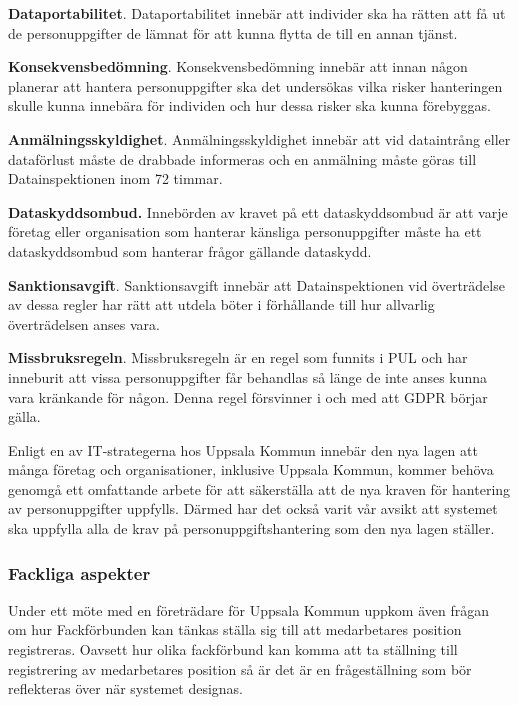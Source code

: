 \documentclass[a4paper,12pt]{article}
\begin{document}
 \textbf{Dataportabilitet}. Dataportabilitet innebär att individer ska ha rätten att få ut de personuppgifter de lämnat för att kunna flytta de till en annan tjänst.

 \textbf{Konsekvensbedömning}. Konsekvensbedömning innebär att innan någon planerar att hantera personuppgifter ska det undersökas vilka risker hanteringen skulle kunna innebära för individen och hur dessa risker ska kunna förebyggas.

 \textbf{Anmälningsskyldighet}. Anmälningsskyldighet innebär att vid dataintrång eller dataförlust måste de drabbade informeras och en anmälning måste göras till Datainspektionen inom 72 timmar.

 \textbf{Dataskyddsombud.} Innebörden av kravet på ett dataskyddsombud är att varje företag eller organisation som hanterar känsliga personuppgifter måste ha ett dataskyddsombud som hanterar frågor gällande dataskydd.

 \textbf{Sanktionsavgift}. Sanktionsavgift innebär att Datainspektionen vid överträdelse av dessa regler har rätt att utdela böter i förhållande till hur allvarlig överträdelsen anses vara.

 \textbf{Missbruksregeln}. Missbruksregeln är en regel som funnits i PUL och har inneburit att vissa personuppgifter får behandlas så länge de inte anses kunna vara kränkande för någon. Denna regel försvinner i och med att GDPR börjar gälla.

 Enligt en av IT-strategerna hos Uppsala Kommun innebär den nya lagen att många företag och organisationer, inklusive Uppsala Kommun, kommer behöva genomgå ett omfattande arbete för att säkerställa att de nya kraven för hantering av personuppgifter uppfylls.
 Därmed har det också varit vår avsikt att systemet ska uppfylla alla de krav på personuppgiftshantering som den nya lagen ställer.

 \subsubsection{Fackliga aspekter}
 Under ett möte med en företrädare för Uppsala Kommun uppkom även frågan om hur Fackförbunden kan tänkas ställa sig till att medarbetares position registreras.
 Oavsett hur olika fackförbund kan komma att ta ställning till registrering av medarbetares position så är det är en frågeställning som bör reflekteras över när systemet designas.

\end{document}
